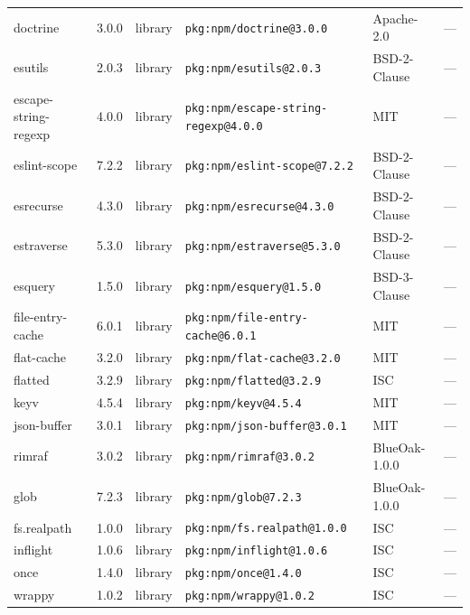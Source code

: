 \documentclass[11pt,a4paper]{article}
\begin{document}
\begin{longtable}{|p{4cm}|p{2cm}|p{1.6cm}|p{5cm}|p{1.5cm}|p{3.5cm}|}
\raggedright doctrine & 3.0.0 & library & \small\texttt{pkg:npm/doctrine@3.0.0} & Apache-2.0 & \small — \\
\raggedright esutils & 2.0.3 & library & \small\texttt{pkg:npm/esutils@2.0.3} & BSD-2-Clause & \small — \\
\raggedright escape-string-regexp & 4.0.0 & library & \small\texttt{pkg:npm/escape-string-regexp@4.0.0} & MIT & \small — \\
\raggedright eslint-scope & 7.2.2 & library & \small\texttt{pkg:npm/eslint-scope@7.2.2} & BSD-2-Clause & \small — \\
\raggedright esrecurse & 4.3.0 & library & \small\texttt{pkg:npm/esrecurse@4.3.0} & BSD-2-Clause & \small — \\
\raggedright estraverse & 5.3.0 & library & \small\texttt{pkg:npm/estraverse@5.3.0} & BSD-2-Clause & \small — \\
\raggedright esquery & 1.5.0 & library & \small\texttt{pkg:npm/esquery@1.5.0} & BSD-3-Clause & \small — \\
\raggedright file-entry-cache & 6.0.1 & library & \small\texttt{pkg:npm/file-entry-cache@6.0.1} & MIT & \small — \\
\raggedright flat-cache & 3.2.0 & library & \small\texttt{pkg:npm/flat-cache@3.2.0} & MIT & \small — \\
\raggedright flatted & 3.2.9 & library & \small\texttt{pkg:npm/flatted@3.2.9} & ISC & \small — \\
\raggedright keyv & 4.5.4 & library & \small\texttt{pkg:npm/keyv@4.5.4} & MIT & \small — \\
\raggedright json-buffer & 3.0.1 & library & \small\texttt{pkg:npm/json-buffer@3.0.1} & MIT & \small — \\
\raggedright rimraf & 3.0.2 & library & \small\texttt{pkg:npm/rimraf@3.0.2} & BlueOak-1.0.0 & \small — \\
\raggedright glob & 7.2.3 & library & \small\texttt{pkg:npm/glob@7.2.3} & BlueOak-1.0.0 & \small — \\
\raggedright fs.realpath & 1.0.0 & library & \small\texttt{pkg:npm/fs.realpath@1.0.0} & ISC & \small — \\
\raggedright inflight & 1.0.6 & library & \small\texttt{pkg:npm/inflight@1.0.6} & ISC & \small — \\
\raggedright once & 1.4.0 & library & \small\texttt{pkg:npm/once@1.4.0} & ISC & \small — \\
\raggedright wrappy & 1.0.2 & library & \small\texttt{pkg:npm/wrappy@1.0.2} & ISC & \small — \\

\end{longtable}
\end{document}
